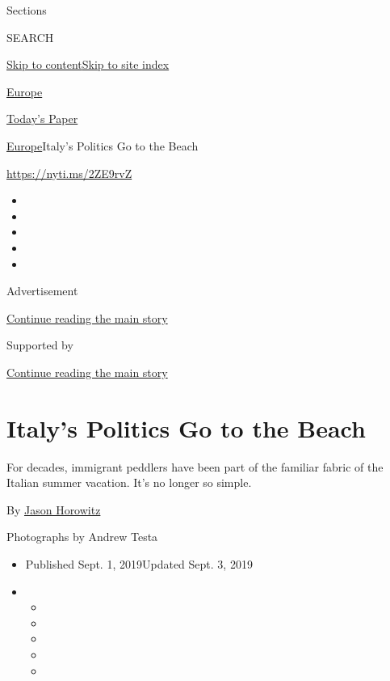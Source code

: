 Sections

SEARCH

\protect\hyperlink{site-content}{Skip to
content}\protect\hyperlink{site-index}{Skip to site index}

\href{https://www.nytimes3xbfgragh.onion/section/world/europe}{Europe}

\href{https://myaccount.nytimes3xbfgragh.onion/auth/login?response_type=cookie\&client_id=vi}{}

\href{https://www.nytimes3xbfgragh.onion/section/todayspaper}{Today's
Paper}

\href{/section/world/europe}{Europe}\textbar{}Italy's Politics Go to the
Beach

\url{https://nyti.ms/2ZE9rvZ}

\begin{itemize}
\item
\item
\item
\item
\item
\end{itemize}

Advertisement

\protect\hyperlink{after-top}{Continue reading the main story}

Supported by

\protect\hyperlink{after-sponsor}{Continue reading the main story}

\hypertarget{italys-politics-go-to-the-beach}{%
\section{Italy's Politics Go to the
Beach}\label{italys-politics-go-to-the-beach}}

For decades, immigrant peddlers have been part of the familiar fabric of
the Italian summer vacation. It's no longer so simple.

By \href{https://www.nytimes3xbfgragh.onion/by/jason-horowitz}{Jason
Horowitz}

Photographs by Andrew Testa

\begin{itemize}
\item
  Published Sept. 1, 2019Updated Sept. 3, 2019
\item
  \begin{itemize}
  \item
  \item
  \item
  \item
  \item
  \end{itemize}
\end{itemize}

